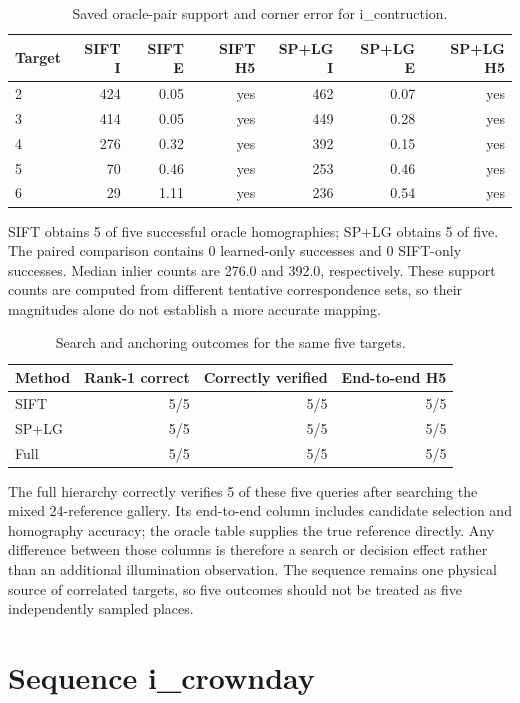 \begin{table}[H]\centering\small
\caption{Saved oracle-pair support and corner error for i\_contruction.}\label{tab:hp-pairs-9}
\begin{tabular}{lrrrrrr}\toprule
Target & SIFT I & SIFT E & SIFT H5 & SP+LG I & SP+LG E & SP+LG H5 \\
\midrule
2 & 424 & 0.05 & yes & 462 & 0.07 & yes \\
3 & 414 & 0.05 & yes & 449 & 0.28 & yes \\
4 & 276 & 0.32 & yes & 392 & 0.15 & yes \\
5 & 70 & 0.46 & yes & 253 & 0.46 & yes \\
6 & 29 & 1.11 & yes & 236 & 0.54 & yes \\
\bottomrule\end{tabular}\end{table}


SIFT obtains 5 of five successful oracle homographies; SP+LG obtains 5 of five. The paired comparison contains 0 learned-only successes and 0 SIFT-only successes. Median inlier counts are 276.0 and 392.0, respectively. These support counts are computed from different tentative correspondence sets, so their magnitudes alone do not establish a more accurate mapping.

\begin{table}[H]\centering\small
\caption{Search and anchoring outcomes for the same five targets.}\label{tab:hp-end-9}
\begin{tabular}{lrrr}\toprule
Method & Rank-1 correct & Correctly verified & End-to-end H5 \\
\midrule
SIFT & 5/5 & 5/5 & 5/5 \\
SP+LG & 5/5 & 5/5 & 5/5 \\
Full & 5/5 & 5/5 & 5/5 \\
\bottomrule\end{tabular}\end{table}


The full hierarchy correctly verifies 5 of these five queries after searching the mixed 24-reference gallery. Its end-to-end column includes candidate selection and homography accuracy; the oracle table supplies the true reference directly. Any difference between those columns is therefore a search or decision effect rather than an additional illumination observation. The sequence remains one physical source of correlated targets, so five outcomes should not be treated as five independently sampled places.

\section{Sequence i\_crownday}

